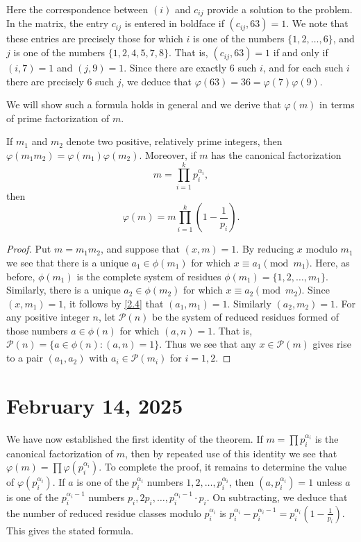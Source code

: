 \documentclass[11pt]{article}
\begin{document}
\begin{solution}
	Here the correspondence between \((i)\) and \(c_{ij}\) provide a solution to the problem.
	In the matrix, the entry \(c_{ij}\) is entered in boldface if \((c_{ij}, 63) = 1\). We note that these entries are precisely those for which \(i\) is one of the numbers \(\{1, 2, \ldots, 6\}\), and \(j\) is one of the numbers \(\{1, 2, 4, 5, 7, 8\}\). That is, \((c_{ij}, 63) = 1\) if and only if \((i, 7) = 1\) and \((j, 9) = 1\). Since there are exactly 6 such \(i\), and for each such \(i\) there are precisely 6 such \(j\), we deduce that \(\varphi(63) = 36 = \varphi(7)\varphi(9)\).
\end{solution}
We will show such a formula holds in general and we derive that  \(\varphi(m)\) in terms of prime factorization of \(m\).
\begin{theorem}\label{2.19}
	If \(m_1\) and \(m_2\) denote two positive, relatively prime integers, then \(\varphi(m_1 m_2) = \varphi(m_1)\varphi(m_2)\). Moreover, if \(m\) has the canonical factorization
	\[m = \prod_{i=1}^{k} p_i^{\alpha_i},\]
	then
	\[\varphi(m) = m \prod_{i=1}^{k} \left(1 - \frac{1}{p_i}\right).\]
\end{theorem}
\begin{proof}
	Put \(m = m_1 m_2\), and suppose that \((x, m) = 1\). By reducing \(x\) modulo \(m_1\) we see that there is a unique \(a_1 \in \phi(m_1)\) for which \(x \equiv a_1 \pmod{m_1}\). Here, as before, \(\phi(m_1)\) is the complete system of residues \(\phi(m_1) = \{1, 2, \ldots, m_1\}\). Similarly, there is a unique \(a_2 \in \phi(m_2)\) for which \(x \equiv a_2 \pmod{m_2}\). Since \((x, m_1) = 1\), it follows by \cref{2.4} that \((a_1, m_1) = 1\). Similarly \((a_2, m_2) = 1\). For any positive integer \(n\), let \(\mathcal{P}(n)\) be the system of reduced residues formed of those numbers \(a \in \phi(n)\) for which \((a, n) = 1\). That is, \(\mathcal{P}(n) = \{a \in \phi(n) : (a, n) = 1\}\). Thus we see that any \(x \in \mathcal{P}(m)\) gives rise to a pair \((a_1, a_2)\) with \(a_i \in \mathcal{P}(m_i)\) for \(i = 1, 2\).
\end{proof}

\section{February 14, 2025}
We have now established the first identity of the theorem. If \(m = \prod p_i^{\alpha_i}\) is the canonical factorization of \(m\), then by repeated use of this identity we see that \(\varphi(m) = \prod \varphi(p_i^{\alpha_i})\). To complete the proof, it remains to determine the value of \(\varphi(p_i^{\alpha_i})\). If \(a\) is one of the \(p_i^{\alpha_i}\) numbers \(1, 2, \ldots, p_i^{\alpha_i}\), then \((a, p_i^{\alpha_i}) = 1\) unless \(a\) is one of the \(p_i^{\alpha_i - 1}\) numbers \(p_i, 2p_i, \ldots, p_i^{\alpha_i - 1} \cdot p_i\). On subtracting, we deduce that the number of reduced residue classes modulo \(p_i^{\alpha_i}\) is \(p_i^{\alpha_i} - p_i^{\alpha_i - 1} = p_i^{\alpha_i}(1 - \frac{1}{p_i})\). This gives the stated formula.
\end{document}
